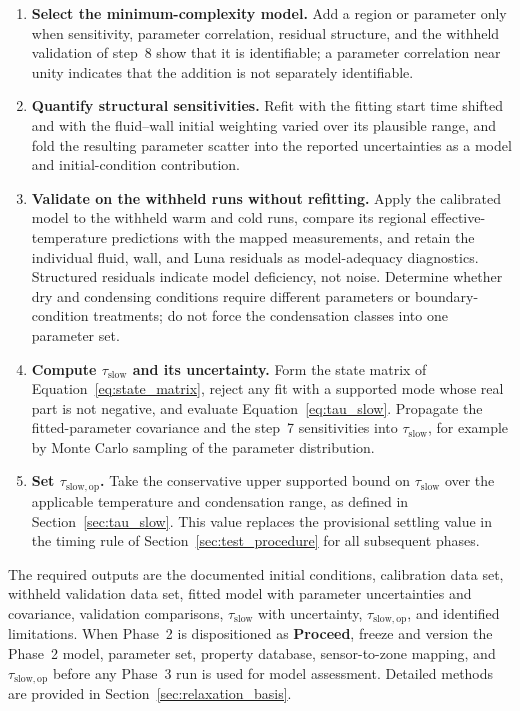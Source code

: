 \documentclass[11pt]{article}
\begin{document}
\begin{enumerate}
    \item \textbf{Select the minimum-complexity model.} Add a region or parameter only when sensitivity, parameter correlation, residual structure, and the withheld validation of step~8 show that it is identifiable; a parameter correlation near unity indicates that the addition is not separately identifiable.

    \item \textbf{Quantify structural sensitivities.} Refit with the fitting start time shifted and with the fluid--wall initial weighting varied over its plausible range, and fold the resulting parameter scatter into the reported uncertainties as a model and initial-condition contribution.

    \item \textbf{Validate on the withheld runs without refitting.} Apply the calibrated model to the withheld warm and cold runs, compare its regional effective-temperature predictions with the mapped measurements, and retain the individual fluid, wall, and Luna residuals as model-adequacy diagnostics. Structured residuals indicate model deficiency, not noise. Determine whether dry and condensing conditions require different parameters or boundary-condition treatments; do not force the condensation classes into one parameter set.

    \item \textbf{Compute $\tau_{\mathrm{slow}}$ and its uncertainty.} Form the state matrix of Equation~\eqref{eq:state_matrix}, reject any fit with a supported mode whose real part is not negative, and evaluate Equation~\eqref{eq:tau_slow}. Propagate the fitted-parameter covariance and the step~7 sensitivities into $\tau_{\mathrm{slow}}$, for example by Monte Carlo sampling of the parameter distribution.

    \item \textbf{Set $\tau_{\mathrm{slow,op}}$.} Take the conservative upper supported bound on $\tau_{\mathrm{slow}}$ over the applicable temperature and condensation range, as defined in Section~\ref{sec:tau_slow}. This value replaces the provisional settling value in the timing rule of Section~\ref{sec:test_procedure} for all subsequent phases.
\end{enumerate}

The required outputs are the documented initial conditions, calibration data set, withheld validation data set, fitted model with parameter uncertainties and covariance, validation comparisons, $\tau_{\mathrm{slow}}$ with uncertainty, $\tau_{\mathrm{slow,op}}$, and identified limitations. When Phase~2 is dispositioned as \textbf{Proceed}, freeze and version the Phase~2 model, parameter set, property database, sensor-to-zone mapping, and $\tau_{\mathrm{slow,op}}$ before any Phase~3 run is used for model assessment. Detailed methods are provided in Section~\ref{sec:relaxation_basis}.
\end{document}
